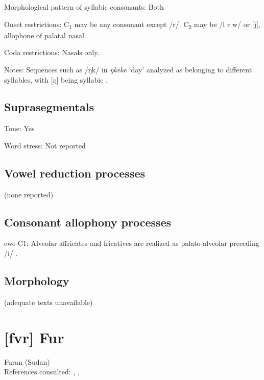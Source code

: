 {\begin{appendixdesc}
\item[Morphological pattern of syllabic consonants:] Both

\item[Onset restrictions:] C\textsubscript{1} may be any consonant except /r/. C\textsubscript{2} may be /l r w/ or [j], allophone of palatal nasal.

\item[Coda restrictions:] Nasals only.

\item[Notes:] Sequences such as /ŋk/ in \textit{ŋkeke} ‘day’ analyzed as belonging to different syllables, with [ŋ] being syllabic \citep[39]{Ameka1991}.
\end{appendixdesc}
\subsection*{Suprasegmentals}
\begin{appendixdesc}
\item[Tone:] Yes

\item[Word stress:] Not reported
\end{appendixdesc}
\subsection*{Vowel reduction processes}

(none reported)

\subsection*{Consonant allophony processes}
\begin{appendixdesc}

\item[ewe-C1:] Alveolar affricates and fricatives are realized as palato-alveolar preceding /i/ \citep[9]{Jalloh2005}.
\end{appendixdesc}
\subsection*{Morphology}

(adequate texts unavailable)
\newpage{}
\section*{[fvr] Fur}  %
Furan (Sudan)\medskip\\
References consulted: \citet{Jakobi1990},  \citet{KutschLojengaWaag2004}, \citet{Noel2008}

}
